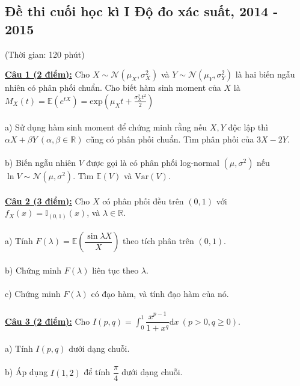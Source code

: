 \documentclass[10pt, a4paper]{article}
\begin{document}
\subsection{Đề thi cuối học kì I Độ đo xác suất, 2014 - 2015}
\begin{center}
	\color{blue}(Thời gian: 120 phút)
\end{center}
\color{red}\underline{\textbf{Câu 1 (2 điểm):}} \color{black}Cho $X\sim\mathcal N\left(\mu_X,\sigma_X^2\right)$ và $Y\sim\mathcal N\left(\mu_Y,\sigma_Y^2\right)$ là hai biến ngẫu nhiên có phân phối chuẩn. Cho biết hàm sinh moment của $X$ là $M_X(t)=\mathbb E\left(e^{tX}\right)=\text{exp}\left(\mu_Xt+\frac{\sigma_X^2t^2}{2}\right)$\\\\
\color{red}a) \color{black}Sử dụng hàm sinh moment để chứng minh rằng nếu $X,Y$ độc lập thì $\alpha X+\beta Y~(\alpha,\beta\in\mathbb R)$ cũng có phân phối chuẩn. Tìm phân phối của $3X-2Y$.\\\\
\color{red}b) \color{black}Biến ngẫu nhiên $V$ được gọi là có phân phối log-normal $\left(\mu,\sigma^2\right)$ nếu $\ln V\sim\mathcal N\left(\mu,\sigma^2\right)$. Tìm $\mathbb E(V)$ và $\text{Var}(V)$.\\\\
\color{red}\underline{\textbf{Câu 2 (3 điểm):}} \color{black}Cho $X$ có phân phối đều trên $(0,1)$ với $f_X(x)=\mathbb I_{(0,1)}(x)$, và $\lambda\in\mathbb R$.\\\\
\color{red}a) \color{black}Tính $F(\lambda)=\mathbb E\left(\dfrac{\sin\lambda X}{X}\right)$ theo tích phân trên $(0,1)$.\\\\
\color{red}b) \color{black}Chứng minh $F(\lambda)$ liên tục theo $\lambda$.\\\\
\color{red}c) \color{black}Chứng minh $F(\lambda)$ có đạo hàm, và tính đạo hàm của nó.\\\\
\color{red}\underline{\textbf{Câu 3 (2 điểm):}} \color{black}Cho $I(p,q)=\displaystyle\int_0^1\dfrac{x^{p-1}}{1+x^q}\text{d}x~(p>0,q\ge0)$.\\\\
\color{red}a) \color{black}Tính $I(p,q)$ dưới dạng chuỗi.\\\\
\color{red}b) \color{black}Áp dụng $I(1,2)$ để tính $\dfrac\pi4$ dưới dạng chuỗi.\\\\
\end{document}
